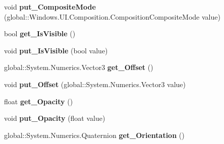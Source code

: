 \begin{DoxyCompactItemize}
\item 
\mbox{\label{interface_windows_1_1_u_i_1_1_composition_1_1_i_visual_a23a31d796c4457b2e748aa0b505ad7c8}} 
void {\bfseries put\+\_\+\+Composite\+Mode} (global\+::\+Windows.\+U\+I.\+Composition.\+Composition\+Composite\+Mode value)
\item 
\mbox{\label{interface_windows_1_1_u_i_1_1_composition_1_1_i_visual_a40a0aa33cd325b0495e9d619fa205241}} 
bool {\bfseries get\+\_\+\+Is\+Visible} ()
\item 
\mbox{\label{interface_windows_1_1_u_i_1_1_composition_1_1_i_visual_a0050bae560148650b7020aec205c3506}} 
void {\bfseries put\+\_\+\+Is\+Visible} (bool value)
\item 
\mbox{\label{interface_windows_1_1_u_i_1_1_composition_1_1_i_visual_aa330691d0b439cb6f52bd0f8ee1acc4f}} 
global\+::\+System.\+Numerics.\+Vector3 {\bfseries get\+\_\+\+Offset} ()
\item 
\mbox{\label{interface_windows_1_1_u_i_1_1_composition_1_1_i_visual_ab591b5dd5dce0a9cdfa72e957ce3731e}} 
void {\bfseries put\+\_\+\+Offset} (global\+::\+System.\+Numerics.\+Vector3 value)
\item 
\mbox{\label{interface_windows_1_1_u_i_1_1_composition_1_1_i_visual_ac8734d1872440f36e957ad510227446a}} 
float {\bfseries get\+\_\+\+Opacity} ()
\item 
\mbox{\label{interface_windows_1_1_u_i_1_1_composition_1_1_i_visual_ad61a737c8ccc4148e0134f10292f5708}} 
void {\bfseries put\+\_\+\+Opacity} (float value)
\item 
\mbox{\label{interface_windows_1_1_u_i_1_1_composition_1_1_i_visual_a523dd4814f2f36f236cfe45314be2dd0}} 
global\+::\+System.\+Numerics.\+Quaternion {\bfseries get\+\_\+\+Orientation} ()
\item 

\end{DoxyCompactItemize}
